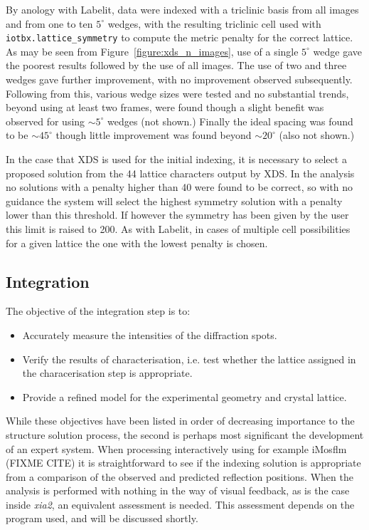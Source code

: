 \documentclass[preprint,pdf]{iucr}
\begin{document}
By anology with Labelit, data were indexed with a triclinic basis
from all images and from one to ten $5^{\circ}$ wedges, with the
resulting triclinic cell used with \verb|iotbx.lattice_symmetry| to
compute the metric penalty for the correct lattice. As may be seen
from Figure~\ref{figure:xds_n_images},
use of a single $5^{\circ}$ wedge gave the poorest
results followed by the use of all images. The use of two and three
wedges gave further improvement, with no improvement observed
subsequently. Following from this, various wedge sizes were tested and
no substantial trends, beyond using at least two frames, were found
though a slight benefit was observed for using $\sim 5^{\circ}$ wedges
(not shown.) Finally the ideal spacing was found to be $\sim
45^{\circ}$ though little improvement was found beyond $\sim
20^{\circ}$ (also not shown.)  

In the case that XDS is used for the initial indexing, it is necessary
to select a proposed solution from the 44 lattice characters output by
XDS. In the analysis no solutions with a penalty higher than 40 were
found to be correct, so with no guidance the system will select the
highest symmetry solution with a penalty lower than this threshold. If
however the symmetry has been given by the user this limit is raised
to 200. As with Labelit, in cases of multiple cell possibilities for a
given lattice the one with the lowest penalty is chosen.

\subsection{Integration}

The objective of the integration step is to:

\begin{itemize}
\item{Accurately measure the intensities of the diffraction spots.}
\item{Verify the results of characterisation, i.e. test whether the
    lattice assigned in the characerisation step is appropriate.}
\item{Provide a refined model for the experimental geometry and
    crystal lattice.}
\end{itemize}

\noindent
While these objectives have been listed in order of decreasing
importance to the structure solution process, the second is perhaps
most significant the development of an expert system. When processing
interactively using for example iMosflm (FIXME CITE) it is
straightforward to see if the indexing solution is appropriate from a
comparison of the observed and predicted reflection positions. When
the analysis is performed with nothing in the way of visual feedback,
as is the case inside \emph{xia2}, an equivalent assessment is
needed. This assessment depends on the program used, and will be
discussed shortly.
\end{document}
